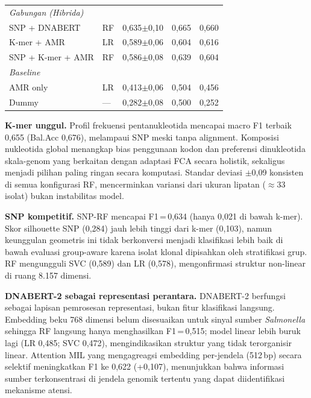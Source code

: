 \documentclass{article}
\begin{document}
\begin{table}[t]
\begin{center}
\begin{scriptsize}
\begin{tabular}{llccc}
        \multicolumn{5}{l}{\textit{Gabungan (Hibrida)}} \\
        SNP + DNABERT    & RF    & 0,635$\pm$0,10  & 0,665   & 0,660  \\
        K-mer + AMR      & LR    & 0,589$\pm$0,06  & 0,604   & 0,616  \\
        SNP + K-mer + AMR& RF    & 0,586$\pm$0,08  & 0,639   & 0,604  \\
        \midrule
        \multicolumn{5}{l}{\textit{Baseline}} \\
        AMR only         & LR    & 0,413$\pm$0,06  & 0,504   & 0,456  \\
        Dummy            & ---   & 0,282$\pm$0,08  & 0,500   & 0,252  \\
        \bottomrule
      \end{tabular}
    \end{scriptsize}
  \end{center}
  \vskip -0.1in
\end{table}

\textbf{K-mer unggul.}
Profil frekuensi pentanukleotida mencapai macro F1 terbaik 0,655 (Bal.Acc
0,676), melampaui SNP meski tanpa alignment. Komposisi nukleotida global
menangkap bias penggunaan kodon dan preferensi dinukleotida skala-genom yang
berkaitan dengan adaptasi FCA secara holistik, sekaligus menjadi pilihan
paling ringan secara komputasi. Standar deviasi $\pm$0,09 konsisten di semua
konfigurasi RF, mencerminkan variansi dari ukuran lipatan ($\approx$33 isolat)
bukan instabilitas model.

\textbf{SNP kompetitif.}
SNP-RF mencapai F1\,=\,0,634 (hanya 0,021 di bawah k-mer). Skor silhouette
SNP (0,284) jauh lebih tinggi dari k-mer (0,103), namun keunggulan geometris
ini tidak berkonversi menjadi klasifikasi lebih baik di bawah evaluasi
group-aware karena isolat klonal dipisahkan oleh stratifikasi grup. RF
mengungguli SVC (0,589) dan LR (0,578), mengonfirmasi struktur non-linear di
ruang 8.157 dimensi.

\textbf{DNABERT-2 sebagai representasi perantara.}
DNABERT-2 berfungsi sebagai lapisan pemrosesan representasi, bukan fitur
klasifikasi langsung. Embedding beku 768 dimensi belum disesuaikan untuk
sinyal sumber \textit{Salmonella} sehingga RF langsung hanya menghasilkan
F1\,=\,0,515; model linear lebih buruk lagi (LR 0,485; SVC 0,472),
mengindikasikan struktur yang tidak terorganisir linear. Attention MIL yang
mengagreagsi embedding per-jendela (512\,bp) secara selektif meningkatkan
F1 ke 0,622 (+0,107), menunjukkan bahwa informasi sumber terkonsentrasi di
jendela genomik tertentu yang dapat diidentifikasi mekanisme atensi.
\end{document}

